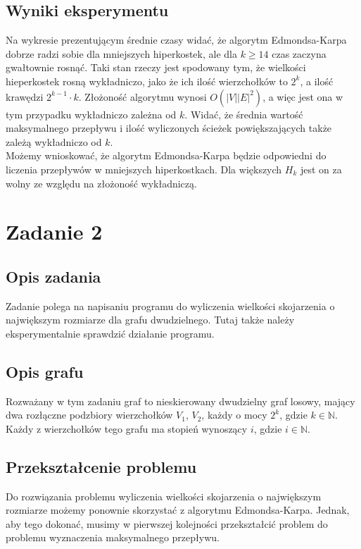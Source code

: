 \documentclass{article}
\begin{document}
\subsection{Wyniki eksperymentu}
Na wykresie prezentującym średnie czasy widać, że algorytm Edmondsa-Karpa dobrze radzi sobie dla mniejszych hiperkostek, ale dla $k \ge 14$ czas zaczyna gwałtownie rosnąć.
Taki stan rzeczy jest spodowany tym, że wielkości hieperkostek rosną wykładniczo, jako że ich ilość wierzchołków to $2^k$, a ilość krawędzi $2^{k - 1} \cdot k$.
Złożoność algorytmu wynosi $O(|V||E|^2)$, a więc jest ona w tym przypadku wykładniczo zależna od $k$.
Widać, że średnia wartość maksymalnego przepływu i ilość wyliczonych ścieżek powiększających także zależą wykładniczo od $k$.\\

Możemy wnioskować, że algorytm Edmondsa-Karpa będzie odpowiedni do liczenia przepływów w mniejszych hiperkostkach.
Dla większych $H_k$ jest on za wolny ze względu na złożoność wykładniczą.

\section{Zadanie 2}
\subsection{Opis zadania}
Zadanie polega na napisaniu programu do wyliczenia wielkości skojarzenia o największym rozmiarze dla grafu dwudzielnego.
Tutaj także należy eksperymentalnie sprawdzić działanie programu.

\subsection{Opis grafu}
Rozważany w tym zadaniu graf to nieskierowany dwudzielny graf losowy, mający dwa rozłączne podzbiory wierzchołków $V_1$, $V_2$, każdy o mocy $2^k$, gdzie $k \in \mathbb{N}$.
Każdy z wierzchołków tego grafu ma stopień wynoszący $i$, gdzie $i \in \mathbb{N}$.

\subsection{Przekształcenie problemu}
Do rozwiązania problemu wyliczenia wielkości skojarzenia o największym rozmiarze możemy ponownie skorzystać z algorytmu Edmondsa-Karpa.
Jednak, aby tego dokonać, musimy w pierwszej kolejności przekształcić problem do problemu wyznaczenia maksymalnego przepływu.
\end{document}
